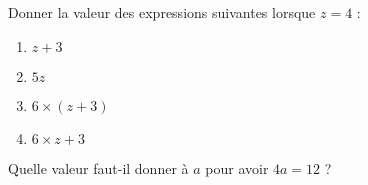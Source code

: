 
\begin{exercice}\label{exo2smath-0078}

    Donner la valeur des expressions suivantes lorsque \( z=4\) :
    \begin{multicols}{4}
        \begin{enumerate}
            \item
                \( z+3\)
            \item
                \( 5z\)
            \item
                \( 6\times(z+3)\)
            \item
                \( 6\times z+3\)
        \end{enumerate}
    \end{multicols}
    Quelle valeur faut-il donner à \( a\) pour avoir \( 4a=12\) ?


\end{exercice}
